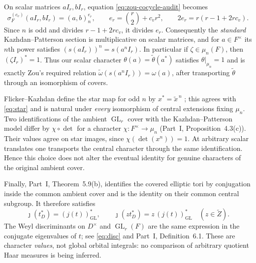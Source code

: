 \documentclass[11pt]{article}
\newcommand{\GL}{\operatorname{GL}}
\newcommand{\tZ}{\widetilde Z}
\theoremstyle{plain}
\theoremstyle{definition}
\begin{document}
On scalar matrices $aI_r,bI_r$, equation
\eqref{eq:zou-cocycle-audit} becomes
\begin{equation}\label{eq:scalar-audit}
 \sigma_F^{(c_v)}(aI_r,bI_r)=(a,b)_n^{e_r},
 \qquad e_r=\binom r2+c_vr^2,
 \qquad 2e_r=r(r-1+2rc_v).
\end{equation}
Since $n$ is odd and divides $r-1+2rc_v$, it divides $e_r$.
Consequently the \emph{standard} Kazhdan--Patterson section is
multiplicative on scalar matrices, and for $a\in F^\times$ its
$n$th power satisfies $(s(aI_r))^n=s(a^n I_r)$.
In particular if $\zeta\in\mu_n(F)$, then $(\zeta I_r)^*=1$.
Thus our scalar character
$\theta(a)=\widetilde\theta(a^*)$ satisfies
$\theta|_{\mu_n}=1$ and is exactly Zou's required relation
$\widetilde\omega(s(a^nI_r))=\omega(a)$, after transporting
$\widetilde\theta$ through an isomorphism of covers.

Flicker--Kazhdan define the star map for odd $n$ by
$x^*=\widetilde x^{\,n}$ \cite[\S4]{FK86}; this agrees with
\eqref{eq:star} and is natural under \emph{every} isomorphism of
central extensions fixing $\mu_n$.  Two identifications of the
ambient $\GL_r$ cover with the Kazhdan--Patterson model differ
by $\chi\circ\det$ for a character $\chi:F^\times\to\mu_n$
(Part~I, Proposition~4.3(c)).  Their values agree on star images,
since $\chi(\det(x^n))=1$.  At arbitrary scalar translates one
transports the central character through the same identification.
Hence this choice does not alter the eventual identity for genuine
characters of the original ambient cover.

Finally, Part~I, Theorem~5.9(b), identifies the covered elliptic
tori by conjugation inside the common ambient cover and is the
identity on their common central subgroup.  It therefore satisfies
\begin{equation}\label{eq:jstar-audit}
 \jmath(t_D^*)=(j(t))_{\GL}^*,\qquad
 \jmath(z t_D^*)=z\,(j(t))_{\GL}^*
 \quad(z\in\tZ).
\end{equation}
The Weyl discriminants on $D^\times$ and $\GL_r(F)$ are the same
expression in the conjugate eigenvalues of $t$; see
\eqref{eq:disc} and Part~I, Definition~6.1.
These are character \emph{values}, not global orbital integrals:
no comparison of arbitrary quotient Haar measures is being inferred.
\end{document}
